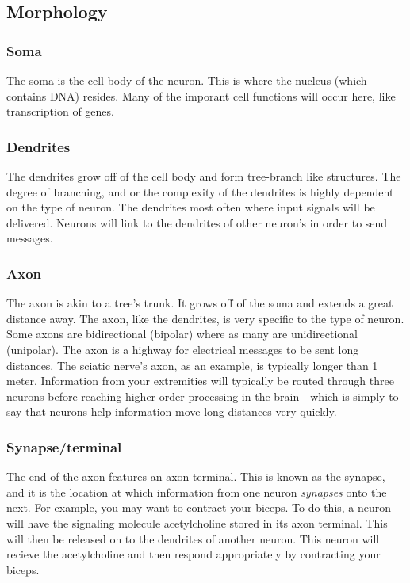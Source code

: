 \documentclass[12pt]{amsart}
\begin{document}
\subsection{Morphology}

\subsubsection{Soma} The soma is the cell body of the neuron. This is where the nucleus (which contains DNA) resides. Many of the imporant cell functions will occur here, like transcription of genes. 

\subsubsection{Dendrites} The dendrites grow off of the cell body and form tree-branch like structures. The degree of branching, and or the complexity of the dendrites is highly dependent on the type of neuron. The dendrites most often where input signals will be delivered. Neurons will link to the dendrites of other neuron's in order to send messages. 

\subsubsection{Axon} The axon is akin to a tree's trunk. It grows off of the soma and extends a great distance away. The axon, like the dendrites, is very specific to the type of neuron. Some axons are bidirectional (bipolar) where as many are unidirectional (unipolar). The axon is a highway for electrical messages to be sent long distances. The sciatic nerve's axon, as an example, is typically longer than 1 meter. Information from your extremities will typically be routed through three neurons before reaching higher order processing in the brain---which is simply to say that neurons help information move long distances very quickly. 

\subsubsection{Synapse/terminal} The end of the axon features an axon terminal. This is known as the synapse, and it is the location at which information from one neuron \textit{synapses} onto the next. For example, you may want to contract your biceps. To do this, a neuron will have the signaling molecule acetylcholine stored in its axon terminal. This will then be released on to the dendrites of another neuron. This neuron will recieve the acetylcholine and then respond appropriately by contracting your biceps. 
\end{document}

